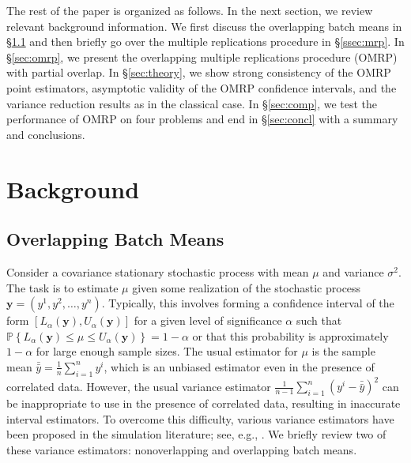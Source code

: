 \documentclass[12pt]{article}
\newcommand{\p}[1]{\mathbb{P} \left\{ #1 \right\}}
\newcommand{\y}{\mathbf{y}}
\newcommand{\yb}{\bar{y}}
\newcommand{\ybb}{\bar{\yb}}
\begin{document}
The rest of the paper is organized as follows.  
In the next section, we review relevant background information.  
We first discuss the overlapping batch means in \S \ref{ssec:obm} and then briefly go over the multiple replications procedure in \S \ref{ssec:mrp}.  
In \S \ref{sec:omrp}, we present the overlapping multiple replications procedure (OMRP) with partial overlap.  
In \S \ref{sec:theory}, we show strong consistency of the OMRP point estimators, asymptotic validity of the OMRP confidence intervals, and the variance reduction results as in the classical case.
In \S \ref{sec:comp}, we test the performance of OMRP on four problems and end in \S \ref{sec:concl} with a summary and conclusions.

\section{Background}
\label{sec:background}

\subsection{Overlapping Batch Means} \label{ssec:obm}
Consider a covariance stationary stochastic process with mean $\mu$ and variance $\sigma^2$.  
The task is to estimate $\mu$ given some realization of the stochastic process $\y = (y^1, y^2, \dots, y^n)$.  
Typically, this involves forming a confidence interval of the form $[L_\alpha(\y), U_\alpha(\y)]$ for a given level of significance $\alpha$ such that $\p{L_\alpha(\y) \leq \mu \leq U_\alpha(\y)} = 1 - \alpha$ or that this probability is approximately $1 - \alpha$ for large enough sample sizes.  
The usual estimator for $\mu$ is the sample mean $\ybb = \frac{1}{n} \sum_{i=1}^n y^i$, which is an unbiased estimator even in the presence of correlated data.  
However, the usual variance estimator $\frac{1}{n-1} \sum_{i=1}^n (y^i - \ybb)^2$ can be inappropriate to use in the presence of correlated data, resulting in inaccurate interval estimators.  
To overcome this difficulty, various variance estimators have been proposed in the simulation literature; see, e.g., \citep{law_07}.  
We briefly review two of these variance estimators: nonoverlapping and overlapping batch means.
\end{document}
